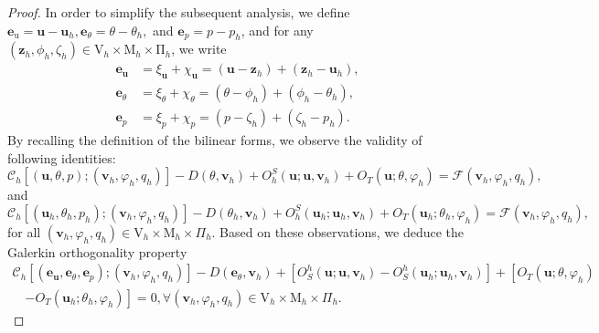 \documentclass[10pt,a4paper]{article}
\begin{document}
  		\begin{proof}
  			In order to simplify the subsequent analysis, we define $\boldsymbol{e}_{\mathrm{u}} = \boldsymbol{u}-\boldsymbol{u}_h, \boldsymbol{e}_{\theta} = \theta -\theta_h,$ and  $\boldsymbol{e}_p = p - p_h$, and for any $\left( \boldsymbol{z}_h, \phi_h, \zeta_h \right) \in \mathrm{V}_h \times \mathrm{M}_h \times \mathrm{\Pi}_h $, we write
  			\begin{align}\label{error_d}
  			\boldsymbol{e}_{\boldsymbol{u}}&=\xi_{\boldsymbol{u}}+\chi_{\boldsymbol{u}}=\left(\boldsymbol{u}-\boldsymbol{z}_h\right)+\left(\boldsymbol{z}_h-\boldsymbol{u}_h\right), \nonumber \\
            \boldsymbol{e}_{\theta}&=\xi_{\theta}+\chi_{\theta}=\left(\theta -\phi_h\right)+\left(\phi_h-\theta _h\right), 
            \\   \boldsymbol{e}_p&=\xi_p+\chi_p=\left(p-\zeta_h\right)+\left(\zeta_h-p_h\right) \nonumber .
  			\end{align}
  			By recalling the definition of the bilinear forms, we observe the validity of following identities:
  			$$
  			\mathcal{C}_h\left[( \boldsymbol{u},\theta,p);(\boldsymbol{v}_h,\varphi_h,q_h)\right] - D(\theta, \boldsymbol{v}_h)+O_h^S(\boldsymbol{u} ; \boldsymbol{u}, \boldsymbol{v}_h) +O_T( \boldsymbol{u}; \theta, \varphi_h)= \mathcal{F}(\boldsymbol{v}_h, \varphi_h, q_h),
  			$$
  			and
  			$$
  			\mathcal{C}_h\left[( \boldsymbol{u}_h,\theta_h,p_h);(\boldsymbol{v}_h,\varphi_h,q_h)\right] - D(\theta_h, \boldsymbol{v}_h)+O_h^S(\boldsymbol{u}_h ; \boldsymbol{u}_h, \boldsymbol{v}_h) +O_T( \boldsymbol{u}_h; \theta_h, \varphi_h)= \mathcal{F}(\boldsymbol{v}_h, \varphi_h, q_h), 
  			$$
  			for all $(\boldsymbol{v}_h,\varphi_h,q_h) \in \mathrm{V}_h \times \mathrm{M}_h \times \Pi_h$. Based on these observations, we deduce the Galerkin orthogonality property
     \begin{align}\label{galerkin_ortho}
\mathcal{C}_h\left[(\boldsymbol{e}_{\boldsymbol{u}}, \boldsymbol{e}_{\theta}, \boldsymbol{e}_p);( \boldsymbol{v}_h, \varphi_h, q_h)\right]  - D (\boldsymbol{e}_{\theta}, \boldsymbol{v}_h) + \left[O_S^h\left(\boldsymbol{u}; \boldsymbol{u}, \boldsymbol{v}_h \right) -O_
S^h \left(\boldsymbol{u}_h; \boldsymbol{u}_h, \boldsymbol{v}_h \right)\right] + \left[O_T\left(\boldsymbol{u}; \theta , \varphi_h \right) \nonumber \right. \\ \quad \left.  - O_T \left(\boldsymbol{u}_h; \theta_h, \varphi_h \right)\right] = 0,  \forall \left( \boldsymbol{v}_h, \varphi_h, q_h \right) \in \mathrm{V}_h \times \mathrm{M}_h \times {\Pi}_h.

\end{align}
\end{proof}
\end{document}
